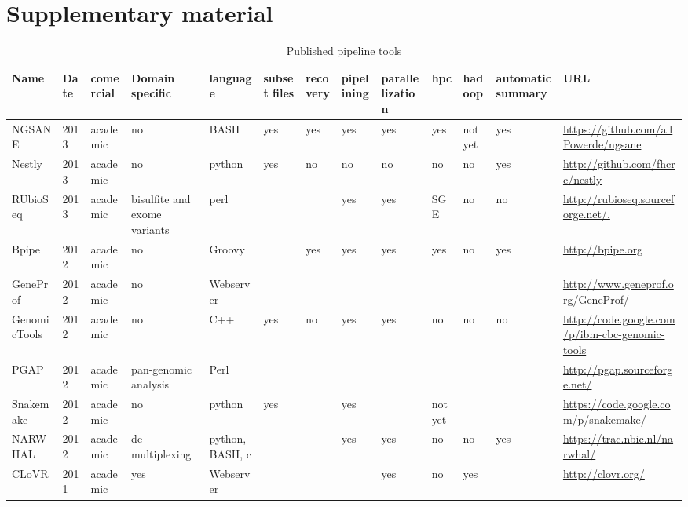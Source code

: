 \documentclass{article}
\begin{document}
\pagestyle{empty}
\section*{Supplementary material}

\begin{landscape}
\begin{table}[htdp]
\tiny 
\caption{Published pipeline tools}
\begin{center}
\begin{tabular}{|p{2cm}|p{0.6cm}|p{1cm}|p{2cm}|p{1cm}|p{1cm}|p{1cm}|p{1cm}|p{1cm}|p{1cm}|p{1cm}|p{1cm}|p{4cm}|}
\hline
Name & Date & comercial & Domain specific & language & subset files & recovery & pipelining & parallelization & hpc & hadoop & automatic summary & URL \\
\hline
NGSANE & 2013 & academic & no & BASH & yes & yes & yes & yes & yes & not yet & yes & \url{https://github.com/allPowerde/ngsane} \\
Nestly~\cite{McCoy2013} & 2013 & academic & no & python & yes & no & no & no & no & no & yes & \url{http://github.com/fhcrc/nestly} \\
RUbioSeq~\cite{Rubio-Camarillo2013} & 2013 & academic & bisulfite and exome variants & perl &  &  & yes & yes & SGE & no & no & \url{http://rubioseq.sourceforge.net/.} \\
Bpipe~\cite{Sadedin2012} & 2012 & academic & no & Groovy &  & yes & yes & yes & yes & no & yes & \url{http://bpipe.org} \\
GeneProf~\cite{Halbritter2012} & 2012 & academic & no & Webserver &  &  &  &  &  &  &  & \url{http://www.geneprof.org/GeneProf/} \\
GenomicTools~\cite{Tsirigos2012} & 2012 & academic & no & C++ & yes & no & yes & yes & no & no & no & \url{http://code.google.com/p/ibm-cbc-genomic-tools} \\
PGAP~\cite{Zhao2012} & 2012 & academic & pan-genomic analysis & Perl &  &  &  &  &  &  &  & \url{http://pgap.sourceforge.net/} \\
Snakemake~\cite{Koester2012} & 2012 & academic & no & python & yes &  & yes &  & not yet &  &  & \url{https://code.google.com/p/snakemake/} \\
NARWHAL~\cite{Brouwer2012} & 2012 & academic & de-multiplexing & python, BASH, c &  &  & yes & yes & no & no & yes & \url{https://trac.nbic.nl/narwhal/} \\
CLoVR~\cite{Angiuoli2011} & 2011 & academic & yes & Webserver &  &  &  & yes & no & yes &  & \url{http://clovr.org/} \\

\end{tabular}
\end{center}
\end{table}
\end{landscape}
\end{document}
